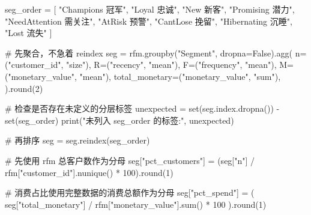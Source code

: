 \documentclass[
]{ctexart}
\newenvironment{Shaded}{\begin{snugshade}}{\end{snugshade}}
\newcommand{\BuiltInTok}[1]{\textcolor[rgb]{0.00,0.23,0.31}{#1}}
\newcommand{\CommentTok}[1]{\textcolor[rgb]{0.37,0.37,0.37}{#1}}
\newcommand{\DecValTok}[1]{\textcolor[rgb]{0.68,0.00,0.00}{#1}}
\newcommand{\NormalTok}[1]{\textcolor[rgb]{0.00,0.23,0.31}{#1}}
\newcommand{\OperatorTok}[1]{\textcolor[rgb]{0.37,0.37,0.37}{#1}}
\newcommand{\StringTok}[1]{\textcolor[rgb]{0.13,0.47,0.30}{#1}}
\newcommand{\VariableTok}[1]{\textcolor[rgb]{0.07,0.07,0.07}{#1}}
\begin{document}
\begin{Shaded}
\begin{Highlighting}[]
\NormalTok{seg\_order }\OperatorTok{=}\NormalTok{ [}
    \StringTok{"Champions 冠军"}\NormalTok{,}
    \StringTok{"Loyal 忠诚"}\NormalTok{,}
    \StringTok{"New 新客"}\NormalTok{,}
    \StringTok{"Promising 潜力"}\NormalTok{,}
    \StringTok{"NeedAttention 需关注"}\NormalTok{,}
    \StringTok{"AtRisk 预警"}\NormalTok{,}
    \StringTok{"CantLose 挽留"}\NormalTok{,}
    \StringTok{"Hibernating 沉睡"}\NormalTok{,}
    \StringTok{"Lost 流失"}
\NormalTok{]}


\CommentTok{\# 先聚合，不急着 reindex}
\NormalTok{seg }\OperatorTok{=}\NormalTok{ rfm.groupby(}\StringTok{"Segment"}\NormalTok{, dropna}\OperatorTok{=}\VariableTok{False}\NormalTok{).agg(}
\NormalTok{    n}\OperatorTok{=}\NormalTok{(}\StringTok{"customer\_id"}\NormalTok{, }\StringTok{"size"}\NormalTok{),}
\NormalTok{    R}\OperatorTok{=}\NormalTok{(}\StringTok{"recency"}\NormalTok{, }\StringTok{"mean"}\NormalTok{),}
\NormalTok{    F}\OperatorTok{=}\NormalTok{(}\StringTok{"frequency"}\NormalTok{, }\StringTok{"mean"}\NormalTok{),}
\NormalTok{    M}\OperatorTok{=}\NormalTok{(}\StringTok{"monetary\_value"}\NormalTok{, }\StringTok{"mean"}\NormalTok{),}
\NormalTok{    total\_monetary}\OperatorTok{=}\NormalTok{(}\StringTok{"monetary\_value"}\NormalTok{, }\StringTok{"sum"}\NormalTok{),}
\NormalTok{).}\BuiltInTok{round}\NormalTok{(}\DecValTok{2}\NormalTok{)}

\CommentTok{\# 检查是否存在未定义的分层标签}
\NormalTok{unexpected }\OperatorTok{=} \BuiltInTok{set}\NormalTok{(seg.index.dropna()) }\OperatorTok{{-}} \BuiltInTok{set}\NormalTok{(seg\_order)}
\BuiltInTok{print}\NormalTok{(}\StringTok{"未列入 seg\_order 的标签:"}\NormalTok{, unexpected)}

\CommentTok{\# 再排序}
\NormalTok{seg }\OperatorTok{=}\NormalTok{ seg.reindex(seg\_order)}

\CommentTok{\# 先使用 rfm 总客户数作为分母}
\NormalTok{seg[}\StringTok{"pct\_customers"}\NormalTok{] }\OperatorTok{=}\NormalTok{ (seg[}\StringTok{"n"}\NormalTok{] }\OperatorTok{/}\NormalTok{ rfm[}\StringTok{"customer\_id"}\NormalTok{].nunique() }\OperatorTok{*} \DecValTok{100}\NormalTok{).}\BuiltInTok{round}\NormalTok{(}\DecValTok{1}\NormalTok{)}

\CommentTok{\# 消费占比使用完整数据的消费总额作为分母}
\NormalTok{seg[}\StringTok{"pct\_spend"}\NormalTok{] }\OperatorTok{=}\NormalTok{ (}
\NormalTok{    seg[}\StringTok{"total\_monetary"}\NormalTok{] }\OperatorTok{/}\NormalTok{ rfm[}\StringTok{"monetary\_value"}\NormalTok{].}\BuiltInTok{sum}\NormalTok{() }\OperatorTok{*} \DecValTok{100}
\NormalTok{).}\BuiltInTok{round}\NormalTok{(}\DecValTok{1}\NormalTok{)}


\end{Highlighting}
\end{Shaded}
\end{document}
